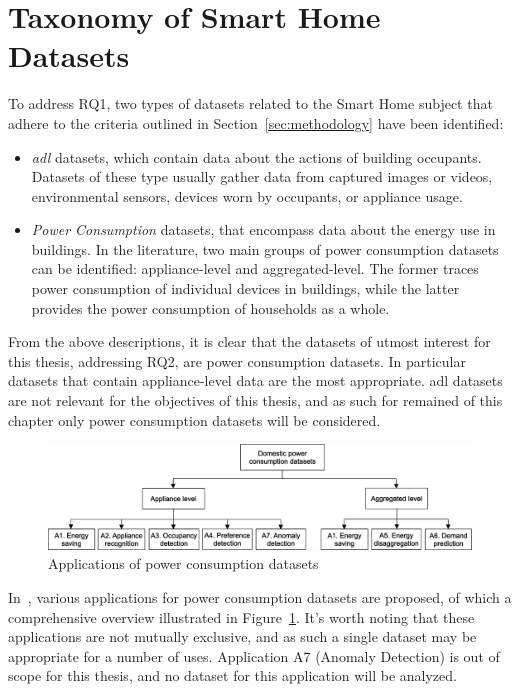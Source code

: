 \section{Taxonomy of Smart Home Datasets}

To address RQ1, two types of datasets related to the Smart Home subject that adhere to the criteria outlined in Section~\ref{sec:methodology} have been identified:
\begin{itemize}
    \item \textit{\acrfull{adl}} datasets, which contain data about the actions of building occupants. Datasets of these type usually gather data from captured images or videos, environmental sensors, devices worn by occupants, or appliance usage.
    \item \textit{Power Consumption} datasets, that encompass data about the energy use in buildings. In the literature, two main groups of power consumption datasets can be identified: appliance-level and aggregated-level. The former traces power consumption of individual devices in buildings, while the latter provides the power consumption of households as a whole.
\end{itemize}
From the above descriptions, it is clear that the datasets of utmost interest for this thesis, addressing RQ2, are power consumption datasets. In particular datasets that contain appliance-level data are the most appropriate. \acrshort{adl} datasets are not relevant for the objectives of this thesis, and as such for remained of this chapter only power consumption datasets will be considered.

\begin{figure}[h]
    \centering
    \includegraphics[width=.9\textwidth]{images/taxonomy_power_consumption.jpg}
    \caption[Applications of power consumption datasets]{Applications of power consumption datasets~\parencite{himeur_building_2020}}
    \label{fig:applications_power_consumption_datasets}
\end{figure}

In~\parencite{himeur_building_2020}, various applications for power consumption datasets are proposed, of which a comprehensive overview illustrated in Figure~\ref{fig:applications_power_consumption_datasets}. It's worth noting that these applications are not mutually exclusive, and as such a single dataset may be appropriate for a number of uses. Application A7 (Anomaly Detection) is out of scope for this thesis, and no dataset for this application will be analyzed.

